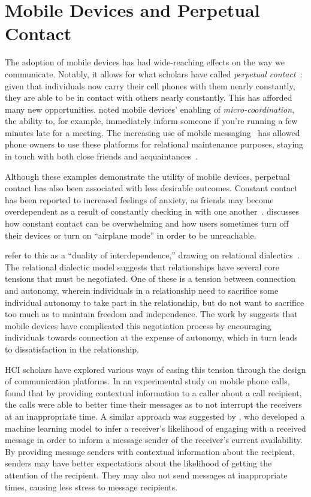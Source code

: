 \documentclass[12pt]{nuthesis}	%
\begin{document}
\section{Mobile Devices and Perpetual Contact}

The adoption of mobile devices has had wide-reaching effects on the way we communicate. Notably, it allows for what scholars have called \textit{perpetual contact}~\citep{katz2002perpetual}: given that individuals now carry their cell phones with them nearly constantly, they are able to be in contact with others nearly constantly. This has afforded many new opportunities. \citet{ling200210} noted mobile devices' enabling of \textit{micro-coordination}, the ability to, for example, immediately inform someone if you're running a few minutes late for a meeting. The increasing use of mobile messaging~\citep{duggan2015mobile,smith2015us} has allowed phone owners to use these platforms for relational maintenance purposes, staying in touch with both close friends and acquaintances~\citep{pettegrew2015smart}.

Although these examples demonstrate the utility of mobile devices, perpetual contact has also been associated with less desirable outcomes. Constant contact has been reported to increased feelings of anxiety, as friends may become overdependent as a result of constantly checking in with one another~\citep{baym2015personal}. \citet{ames2013managing} discusses how constant contact can be overwhelming and how users sometimes turn off their devices or turn on ``airplane mode'' in order to be unreachable.

\citet{hall2012calling} refer to this as a ``duality of interdependence,'' drawing on relational dialectics~\citep{baxter1993relationship}. The relational dialectic model suggests that relationships have several core tensions that must be negotiated. One of these is a tension between connection and autonomy, wherein individuals in a relationship need to sacrifice some individual autonomy to take part in the relationship, but do not want to sacrifice too much as to maintain freedom and independence. The work by \citeauthor{hall2012calling} suggests that mobile devices have complicated this negotiation process by encouraging individuals towards connection at the expense of autonomy, which in turn leads to dissatisfaction in the relationship.

HCI scholars have explored various ways of easing this tension through the design of communication platforms. In an experimental study on mobile phone calls, \citet{avrahami2007improving} found that by providing contextual information to a caller about a call recipient, the calls were able to better time their messages as to not interrupt the receivers at an inappropriate time. A similar approach was suggested by \citet{pielot2014didn}, who developed a machine learning model to infer a receiver's likelihood of engaging with a received message in order to inform a message sender of the receiver's current availability. By providing message senders with contextual information about the recipient, senders may have better expectations about the likelihood of getting the attention of the recipient. They may also not send messages at inappropriate times, causing less stress to message recipients.
\end{document}
